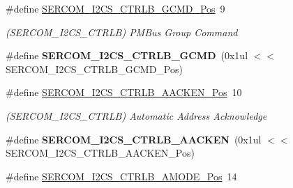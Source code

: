 \begin{DoxyCompactItemize}
\item 
\hypertarget{group___s_a_m_l21___s_e_r_c_o_m_gaecd606c38c836f759f83da88507a4aec}{}\#define \hyperlink{group___s_a_m_l21___s_e_r_c_o_m_gaecd606c38c836f759f83da88507a4aec}{S\+E\+R\+C\+O\+M\+\_\+\+I2\+C\+S\+\_\+\+C\+T\+R\+L\+B\+\_\+\+G\+C\+M\+D\+\_\+\+Pos}~9\label{group___s_a_m_l21___s_e_r_c_o_m_gaecd606c38c836f759f83da88507a4aec}

\begin{DoxyCompactList}\small\item\em (S\+E\+R\+C\+O\+M\+\_\+\+I2\+C\+S\+\_\+\+C\+T\+R\+L\+B) P\+M\+Bus Group Command \end{DoxyCompactList}\item 
\hypertarget{group___s_a_m_l21___s_e_r_c_o_m_ga8c1a178389cb00286fc9913d1663f6ae}{}\#define {\bfseries S\+E\+R\+C\+O\+M\+\_\+\+I2\+C\+S\+\_\+\+C\+T\+R\+L\+B\+\_\+\+G\+C\+M\+D}~(0x1ul $<$$<$ S\+E\+R\+C\+O\+M\+\_\+\+I2\+C\+S\+\_\+\+C\+T\+R\+L\+B\+\_\+\+G\+C\+M\+D\+\_\+\+Pos)\label{group___s_a_m_l21___s_e_r_c_o_m_ga8c1a178389cb00286fc9913d1663f6ae}

\item 
\hypertarget{group___s_a_m_l21___s_e_r_c_o_m_gadcca259920f7bfbf8b1ba71344524aa8}{}\#define \hyperlink{group___s_a_m_l21___s_e_r_c_o_m_gadcca259920f7bfbf8b1ba71344524aa8}{S\+E\+R\+C\+O\+M\+\_\+\+I2\+C\+S\+\_\+\+C\+T\+R\+L\+B\+\_\+\+A\+A\+C\+K\+E\+N\+\_\+\+Pos}~10\label{group___s_a_m_l21___s_e_r_c_o_m_gadcca259920f7bfbf8b1ba71344524aa8}

\begin{DoxyCompactList}\small\item\em (S\+E\+R\+C\+O\+M\+\_\+\+I2\+C\+S\+\_\+\+C\+T\+R\+L\+B) Automatic Address Acknowledge \end{DoxyCompactList}\item 
\hypertarget{group___s_a_m_l21___s_e_r_c_o_m_ga1a1d0f42bce4238421bd6cd04d0e8704}{}\#define {\bfseries S\+E\+R\+C\+O\+M\+\_\+\+I2\+C\+S\+\_\+\+C\+T\+R\+L\+B\+\_\+\+A\+A\+C\+K\+E\+N}~(0x1ul $<$$<$ S\+E\+R\+C\+O\+M\+\_\+\+I2\+C\+S\+\_\+\+C\+T\+R\+L\+B\+\_\+\+A\+A\+C\+K\+E\+N\+\_\+\+Pos)\label{group___s_a_m_l21___s_e_r_c_o_m_ga1a1d0f42bce4238421bd6cd04d0e8704}

\item 
\hypertarget{group___s_a_m_l21___s_e_r_c_o_m_ga3a2e9eb3ba2460c2e89a056f56b5e0d4}{}\#define \hyperlink{group___s_a_m_l21___s_e_r_c_o_m_ga3a2e9eb3ba2460c2e89a056f56b5e0d4}{S\+E\+R\+C\+O\+M\+\_\+\+I2\+C\+S\+\_\+\+C\+T\+R\+L\+B\+\_\+\+A\+M\+O\+D\+E\+\_\+\+Pos}~14\label{group___s_a_m_l21___s_e_r_c_o_m_ga3a2e9eb3ba2460c2e89a056f56b5e0d4}


\end{DoxyCompactItemize}
